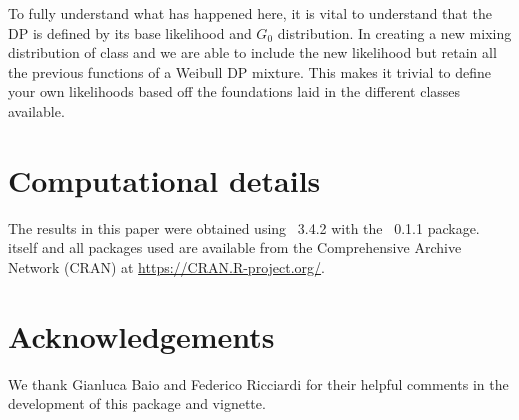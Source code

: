 \documentclass[nojss]{jss}
\begin{document}
To fully understand what has happened here, it is vital to understand that the DP is defined by its base likelihood and $G_0$ distribution. In creating a new mixing distribution of class  and  we are able to include the new likelihood but retain all the previous functions of a Weibull DP mixture. This makes it trivial to define your own likelihoods based off the foundations laid in the different classes available.

\section*{Computational details}


The results in this paper were obtained using
~3.4.2 with the
~0.1.1 package.  itself
and all packages used are available from the Comprehensive
 Archive Network (CRAN) at
\url{https://CRAN.R-project.org/}.


\section*{Acknowledgements}

We thank Gianluca Baio and Federico Ricciardi for their helpful comments in the development of this package and vignette.





\end{document}
